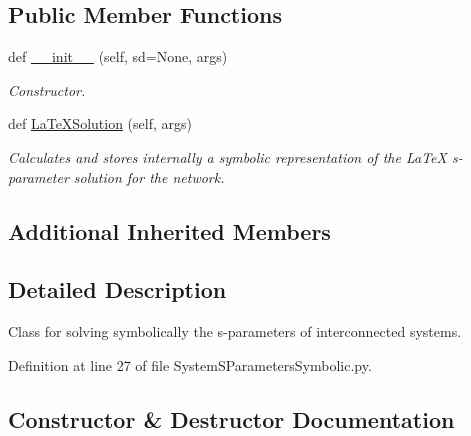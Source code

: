 \subsection*{Public Member Functions}
\begin{DoxyCompactItemize}
\item 
def \hyperlink{classSignalIntegrity_1_1SystemDescriptions_1_1SystemSParametersSymbolic_1_1SystemSParametersSymbolic_a72fa31992e716f60779f561f6cdbb4ce}{\+\_\+\+\_\+init\+\_\+\+\_\+} (self, sd=None, args)
\begin{DoxyCompactList}\small\item\em Constructor. \end{DoxyCompactList}\item 
def \hyperlink{classSignalIntegrity_1_1SystemDescriptions_1_1SystemSParametersSymbolic_1_1SystemSParametersSymbolic_af98307fa6ec51f1bd11fe6abebbb9595}{La\+Te\+X\+Solution} (self, args)
\begin{DoxyCompactList}\small\item\em Calculates and stores internally a symbolic representation of the La\+TeX s-\/parameter solution for the network. \end{DoxyCompactList}\end{DoxyCompactItemize}
\subsection*{Additional Inherited Members}


\subsection{Detailed Description}
Class for solving symbolically the s-\/parameters of interconnected systems. 



Definition at line 27 of file System\+S\+Parameters\+Symbolic.\+py.



\subsection{Constructor \& Destructor Documentation}
\mbox{\label{classSignalIntegrity_1_1SystemDescriptions_1_1SystemSParametersSymbolic_1_1SystemSParametersSymbolic_a72fa31992e716f60779f561f6cdbb4ce}} 
